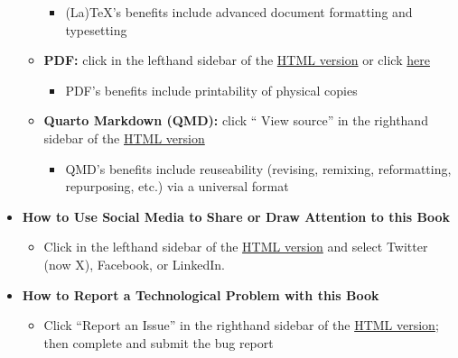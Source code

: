 \documentclass[
  letterpaper,
]{book}
\providecommand{\tightlist}{%
  \setlength{\itemsep}{0pt}\setlength{\parskip}{0pt}}\usepackage{longtable,booktabs,array}
\begin{document}
\begin{itemize}
\begin{itemize}
    \begin{itemize}
    \tightlist
    \item
      (La)TeX's benefits include advanced document formatting and
      typesetting
    \end{itemize}
  \item
    \textbf{PDF:} click in the lefthand sidebar of the
    \href{https://iulibscholcomm.github.io/through-the-looking-glass/}{HTML
    version} or click
    \href{https://iulibscholcomm.github.io/through-the-looking-glass/Through-the-Looking-Glass--I.-Why-Cross-Fertilize-.pdf}{here}

    \begin{itemize}
    \tightlist
    \item
      PDF's benefits include printability of physical copies
    \end{itemize}
  \item
    \textbf{Quarto Markdown (QMD):} click `` View source'' in the
    righthand sidebar of the
    \href{https://iulibscholcomm.github.io/through-the-looking-glass/}{HTML
    version}

    \begin{itemize}
    \tightlist
    \item
      QMD's benefits include reuseability (revising, remixing,
      reformatting, repurposing, etc.) via a universal format
    \end{itemize}
  \end{itemize}
\item
  \textbf{How to Use Social Media to Share or Draw Attention to this
  Book}

  \begin{itemize}
  \tightlist
  \item
    Click in the lefthand sidebar of the
    \href{https://iulibscholcomm.github.io/through-the-looking-glass/}{HTML
    version} and select Twitter (now X), Facebook, or LinkedIn.
  \end{itemize}
\item
  \textbf{How to Report a Technological Problem with this Book}

  \begin{itemize}
  \tightlist
  \item
    Click ``Report an Issue'' in the righthand sidebar of the
    \href{https://iulibscholcomm.github.io/through-the-looking-glass/}{HTML
    version}; then complete and submit the bug report
  \end{itemize}
\end{itemize}
\end{document}
